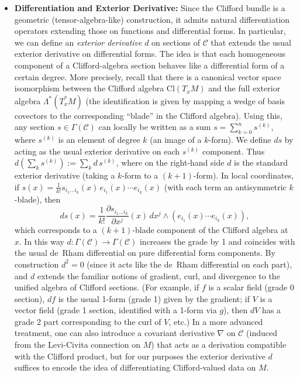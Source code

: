 \documentclass[12pt]{article}
\newcommand{\Cl}{\mathrm{Cl}}
\begin{document}
\begin{itemize}
    \item \textbf{Differentiation and Exterior Derivative:} Since the Clifford bundle is a geometric (tensor-algebra-like) construction, it admits natural differentiation operators extending those on functions and differential forms. In particular, we can define an \emph{exterior derivative} $d$ on sections of $\mathcal{C}$ that extends the usual exterior derivative on differential forms. The idea is that each homogeneous component of a Clifford-algebra section behaves like a differential form of a certain degree. More precisely, recall that there is a canonical vector space isomorphism between the Clifford algebra $\Cl(T_xM)$ and the full exterior algebra $\Lambda^*(T_x^*M)$ (the identification is given by mapping a wedge of basis covectors to the corresponding “blade” in the Clifford algebra). Using this, any section $s \in \Gamma(\mathcal{C})$ can locally be written as a sum $s = \sum_{k=0}^n s^{(k)}$, where $s^{(k)}$ is an element of degree $k$ (an image of a $k$-form). We define $d s$ by acting as the usual exterior derivative on each $s^{(k)}$ component.  Thus $d(\sum_k s^{(k)}) := \sum_k d\,s^{(k)}$, where on the right-hand side $d$ is the standard exterior derivative (taking a $k$-form to a $(k+1)$-form). In local coordinates, if $s(x) = \frac{1}{k!} s_{i_1\ldots i_k}(x)\,e_{i_1}(x)\cdots e_{i_k}(x)$ (with each term an antisymmetric $k$-blade), then 
    \[
       d s(x) = \frac{1}{k!} \frac{\partial s_{i_1\ldots i_k}}{\partial x^j}(x)\,dx^j \wedge (e_{i_1}(x)\cdots e_{i_k}(x)) ,
    \] 
    which corresponds to a $(k+1)$-blade component of the Clifford algebra at $x$. In this way $d: \Gamma(\mathcal{C}) \to \Gamma(\mathcal{C})$ increases the grade by 1 and coincides with the usual de~Rham differential on pure differential form components. By construction $d^2=0$ (since it acts like the de~Rham differential on each part), and $d$ extends the familiar notions of gradient, curl, and divergence to the unified algebra of Clifford sections. (For example, if $f$ is a scalar field (grade 0 section), $df$ is the usual 1-form (grade 1) given by the gradient; if $V$ is a vector field (grade 1 section, identified with a 1-form via $g$), then $dV$ has a grade 2 part corresponding to the curl of $V$, etc.) In a more advanced treatment, one can also introduce a covariant derivative $\nabla$ on $\mathcal{C}$ (induced from the Levi-Civita connection on $M$) that acts as a derivation compatible with the Clifford product, but for our purposes the exterior derivative $d$ suffices to encode the idea of differentiating Clifford-valued data on $M$. 


\end{itemize}
\end{document}
